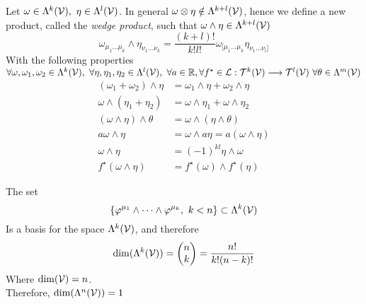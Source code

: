 \documentclass[../complete.tex]{subfiles}
\begin{document}
\begin{dfn}
	Let $\omega\in\Lambda^k(\V),\ \eta\in\Lambda^l(\V)$. In general $\omega\otimes\eta\notin\Lambda^{k+l}(\mathcal{V})$, hence we define a new product, called the \textit{wedge product}, such that $\omega\wedge\eta\in\Lambda^{k+l}(\mathcal{V})$
	\begin{equation}
		\omega_{\mu_1\ldots\mu_k}\wedge\eta_{\nu_1\ldots\nu_k}=\frac{(k+l)!}{k!l!}\omega_{[\mu_1\ldots\mu_k}\eta_{\nu_1\ldots\nu_l]}
		\label{eq:wedgreprod}
	\end{equation}
	With the following properties\\
	$\forall\omega,\omega_1,\omega_2\in\Lambda^k(\V),\ \forall\eta,\eta_1,\eta_2\in\Lambda^l(\V),\ \forall a\in\R,\forall f^\star\in\mathcal{L}:\tpwr^k(\V)\fto\tpwr^l(\V)\ \forall\theta\in\Lambda^m(\V)$
	\begin{equation}
		\begin{aligned}
			(\omega_1+\omega_2)\wedge\eta&=\omega_1\wedge\eta+\omega_2\wedge\eta\\
			\omega\wedge(\eta_1+\eta_2)&=\omega\wedge\eta_1+\omega\wedge\eta_2\\
			(\omega\wedge\eta)\wedge\theta&=\omega\wedge(\eta\wedge\theta)\\
			a\omega\wedge\eta&=\omega\wedge a\eta=a(\omega\wedge\eta)\\
			\omega\wedge\eta&=(-1)^{kl}\eta\wedge\omega\\
			f^\star(\omega\wedge\eta)&=f^\star(\omega)\wedge f^\star(\eta)
		\end{aligned}
		\label{eq:wedgeprod}
	\end{equation}
\end{dfn}
\begin{thm}
	The set
	\begin{equation}
		\{\varphi^{\mu_1}\wedge\cdots\wedge\varphi^{\mu_k},\ k<n\}\subset\Lambda^k(\V)
		\label{eq:basislambdabig}
	\end{equation}
	Is a basis for the space $\Lambda^k(\mathcal{V})$, and therefore
	\begin{equation*}
		\dim(\Lambda^k(\mathcal{V}))=\begin{pmatrix}n\\k\end{pmatrix}=\frac{n!}{k!(n-k)!}
	\end{equation*}
	Where $\dim(\mathcal{V})=n$.\\
	Therefore, $\dim(\Lambda^n(\mathcal{V}))=1$
\end{thm}
\end{document}
